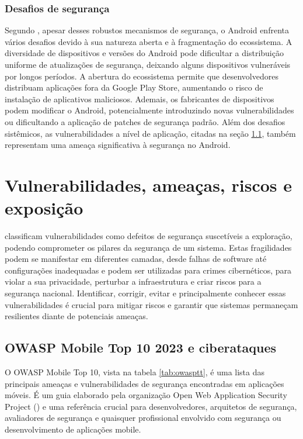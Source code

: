     \subsubsection{Desafios de segurança}
    Segundo , apesar desses robustos mecanismos de segurança, o Android enfrenta vários desafios devido à sua natureza aberta e à fragmentação do ecossistema. A diversidade de dispositivos e versões do Android pode dificultar a distribuição uniforme de atualizações de segurança, deixando alguns dispositivos vulneráveis por longos períodos. A abertura do ecossistema permite que desenvolvedores distribuam aplicações fora da Google Play Store, aumentando o risco de instalação de aplicativos maliciosos. Ademais, os fabricantes de dispositivos podem modificar o Android, potencialmente introduzindo novas vulnerabilidades ou dificultando a aplicação de patches de segurança padrão. Além dos desafios sistêmicos, as vulnerabilidades a nível de aplicação, citadas na seção \ref{owasp}, também representam uma ameaça significativa à segurança no Android. 
    
    \section{Vulnerabilidades, ameaças, riscos e exposição}
     classificam vulnerabilidades como defeitos de segurança suscetíveis a exploração, podendo comprometer os pilares da segurança de um sistema. Estas fragilidades podem se manifestar em diferentes camadas, desde falhas de software até configurações inadequadas e podem ser utilizadas para crimes cibernéticos, para violar a sua privacidade, perturbar a infraestrutura e criar riscos para a segurança nacional. Identificar, corrigir, evitar e principalmente conhecer essas vulnerabilidades é crucial para mitigar riscos e garantir que sistemas permaneçam resilientes diante de potenciais ameaças.
    
    \subsection{OWASP Mobile Top 10 2023 e ciberataques}
    \label{owasp}
    
    O OWASP Mobile Top 10, vista na tabela \ref{tab:owasptt}, é uma lista das principais ameaças e vulnerabilidades de segurança encontradas em aplicações móveis. É um guia elaborado pela organização Open Web Application Security Project () e uma referência crucial para desenvolvedores, arquitetos de segurança, avaliadores de segurança e quaisquer profissional envolvido com segurança ou desenvolvimento de aplicações mobile. 

